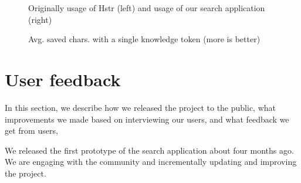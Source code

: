 \begin{figure}
\centering
{}\hfill
{}
\caption{Avg. saved chars. with a single knowledge token (more is better)}
\small{Originally usage of Hstr (left) and usage of our search application (right)}
\label{eval-metrics-plot-dist-1-chars}
\end{figure}


\section{User feedback}

In this section, we describe how we released the project to the public, what improvements we made based on interviewing our users, and what feedback we get from users,

We released the first prototype of the search application about four months ago. We are engaging with the community and incrementally updating and improving the project. 

